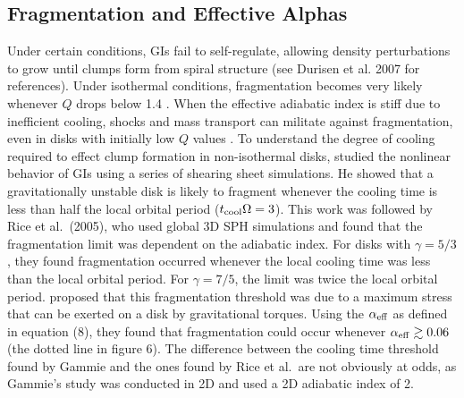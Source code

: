 \documentclass[manuscript]{aastex}
\begin{document}
\subsection{Fragmentation and Effective Alphas}

\noindent

Under certain conditions, GIs fail to self-regulate, allowing density perturbations to grow until clumps form from spiral structure (see Durisen et al. 2007 for references).  Under isothermal conditions, fragmentation becomes very likely whenever $Q$ drops below 1.4 
\citep{tomley1991, tomley1994, nelson1998, mayer2002}. When the effective adiabatic index is stiff due to inefficient
cooling, shocks and mass transport can militate against fragmentation, even in disks with initially low $Q$ values
\citep[e.g., ][]{boley2008}. To understand the degree of cooling required to effect clump formation in non-isothermal
disks, \cite{gammie2001} studied the nonlinear behavior of GIs using a series of shearing sheet simulations.  He showed
that  a gravitationally unstable disk is likely to fragment whenever the cooling time is less than half the local
orbital period ($t_{\rm cool}\Omega = 3$).  This work was followed by Rice et al.~(2005), who used global 3D SPH simulations and found that the fragmentation limit was dependent on the adiabatic index.   For disks with $\gamma=5/3$, they found fragmentation 
occurred whenever the local cooling time was less than the local orbital period. For $\gamma=7/5$, the limit was twice the local orbital period.  \cite{rice2005} proposed that this fragmentation threshold was due to a maximum stress that can  be exerted on a disk by gravitational torques.  Using the $\alpha_{\rm{eff}}$ as defined in equation (8), they found that fragmentation could occur whenever $\alpha_{\rm eff}\gtrsim 0.06$ (the dotted line in figure 6).  The difference between the cooling time threshold found by Gammie and the ones found by Rice et al.~are not obviously at odds, as Gammie's study was conducted in 2D and used a 2D adiabatic index of 2.  
\end{document}
